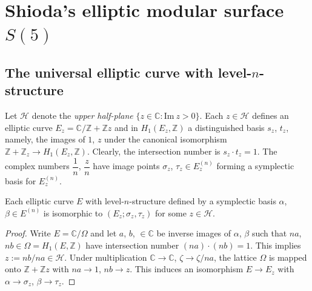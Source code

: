 \section{Shioda's elliptic modular surface \texorpdfstring{$S(5)$}{S5}}\label{chap2-sec4}

\subsection{The universal elliptic curve with
level-\texorpdfstring{$n$}{n}-structure}\label{chap2-sec4.1} 

Let $\mathscr{H}$ denote the {\em upper half-plane}
$\{z\in \mathbb{C}:\text{Im}~z>0\}$. Each $z\in \mathscr{H}$ defines an
elliptic curve $E_{z}=\mathbb{C}/\mathbb{Z}+\mathbb{Z}z$ and in
$H_{1}(E_{z},\mathbb{Z})$ a distinguished basis $s_{z}$, $t_{z}$,
namely, the images of $1$, $z$ under the canonical isomorphism
$\mathbb{Z}+\mathbb{Z}_{z}\to H_{1}(E_{z},\mathbb{Z})$. Clearly, the
intersection number is $s_{z}\cdot t_{z}=1$. The complex numbers\pageoriginale
$\dfrac{1}{n}$, $\dfrac{z}{n}$ have image points $\sigma_{z}$,
$\tau_{z}\in E^{(n)}_{z}$ forming a symplectic basis for $E^{(n)}_{z}$.

\begin{lemma}\label{chap2-lem5}
Each elliptic curve $E$ with level-$n$-structure defined by a
symplectic basis $\alpha$, $\beta\in E^{(n)}$ is isomorphic to
$(E_{z};\sigma_{z},\tau_{z})$ for some $z\in \mathscr{H}$.
\end{lemma}

\begin{proof}
Write $E=\mathbb{C}/\Omega$ and let $a$, $b$, $\in \mathbb{C}$ be
inverse images of $\alpha$, $\beta$ such that $na$,
$nb\in \Omega=H_{1}(E,\mathbb{Z})$ have intersection number $(na)\cdot
(nb)=1$. This implies $z:=nb/na\in \mathscr{H}$. Under multiplication
$\mathbb{C}\to \mathbb{C}$, $\zeta\to \zeta/na$, the lattice $\Omega$
is mapped onto $\mathbb{Z}+\mathbb{Z}z$ with $na\to 1$, $nb\to
z$. This induces an isomorphism $E\to E_{z}$ with
$\alpha\to \sigma_{z}$, $\beta\to \tau_{z}$.
\end{proof}

